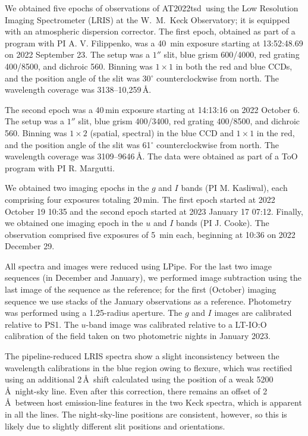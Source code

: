 \documentclass{nature_plusfigure}
\newcommand{\at}{AT2022tsd}
\begin{document}
\begin{methods}
We obtained five epochs of observations of \at\ using the Low Resolution Imaging Spectrometer (LRIS\cite{Oke1995}) at the W.~M.~Keck Observatory; it is equipped with an atmospheric dispersion corrector. The first epoch, obtained as part of a program with PI A. V. Filippenko, was a 40~min exposure starting at 13:52:48.69 on 2022 September 23. The setup was a $1''$ slit, blue grism 600/4000, red grating 400/8500, and dichroic 560. Binning was $1 \times 1$ in both the red and blue CCDs, and the position angle of the slit was 30$^\circ$ counterclockwise from north. The wavelength coverage was 3138--10,259\,\AA. 

The second epoch was a 40\,min exposure starting at 14:13:16 on 2022 October 6. The setup was a $1''$ slit, blue grism 400/3400, red grating 400/8500, and dichroic 560. Binning was $1 \times 2$ (spatial, spectral) in the blue CCD and $1\times1$ in the red, and the position angle of the slit was 61$^\circ$ counterclockwise from north. The wavelength coverage was 3109--9646\,\AA. The data were obtained as part of a ToO program with PI R. Margutti. 

We obtained two imaging epochs in the $g$ and $I$ bands (PI M. Kasliwal), each comprising four exposures totaling 20\,min. The first epoch started at 2022 October 19 10:35 and the second epoch started at 2023 January 17 07:12. 
Finally, we obtained one imaging epoch in the $u$ and $I$ bands (PI J. Cooke). The observation comprised five exposures of 5~min each, beginning at 10:36 on 2022 December 29.

All spectra and images were reduced using LPipe\cite{PerleyLPipe}.
For the last two image sequences (in December and January), we performed image subtraction using the last image of the sequence as the reference; for the first (October) imaging sequence we use stacks of the January observations as a reference.  Photometry was performed using a 1.25\arcsec-radius aperture.  The $g$ and $I$ images are calibrated relative to PS1.  The $u$-band image was calibrated relative to a LT-IO:O calibration of the field taken on two photometric nights in January 2023.

The pipeline-reduced LRIS spectra show a slight inconsistency between the wavelength calibrations in the blue region owing to flexure, which was rectified using an additional 2\,\AA\ shift calculated using the position of a weak 5200\,\AA\ night-sky line.
Even after this correction, there remains an offset of 2\,\AA\ between host emission-line features in the two Keck spectra, which is apparent in all the lines. The night-sky-line positions are consistent, however, so this is likely due to slightly different slit positions and orientations. 


\end{methods}
\end{document}

